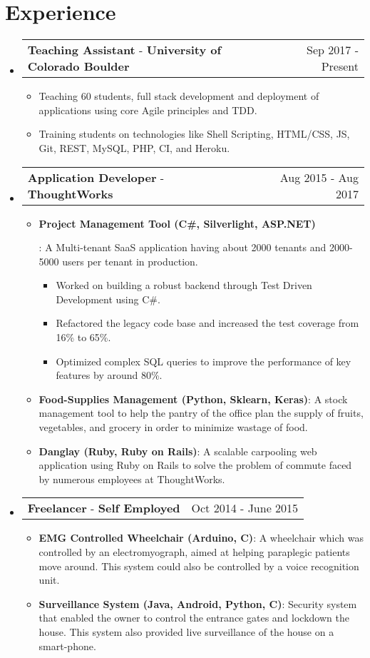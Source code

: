 \documentclass[letterpaper,11pt]{article}
\makeatletter
\newcommand{\resumeItem}[2]{
  \linespread{1.1}
  \item\small{
      \textbf{#1}{: #2}
    }
}
\newcommand{\resumePoint}[1]{
  \linespread{1.2}
  \item\small{#1}
}
\newcommand{\resumeExperienceSubheading}[5]{
  \vspace{-3pt}\item
    \begin{tabular*}{0.97\textwidth}{l@{\extracolsep{\fill}}r}
      \textbf{#1} \normalfont{\small#2} - \textbf{#3}\normalfont{#4} & #5 \\
    \end{tabular*}\vspace{-4pt}
}
\newcommand{\resumeSubHeadingListStart}{\begin{itemize}[leftmargin=*]}
\newcommand{\resumeSubHeadingListEnd}{\end{itemize}\vspace{-14pt}}
\newcommand{\resumeItemListStart}{\begin{itemize}}
\newcommand{\resumeItemListEnd}{\end{itemize}\vspace{-2pt}}
\newcommand{\resumeInnerItemListStart}{\begin{itemize}}
\newcommand{\resumeInnerItemListEnd}{\end{itemize}}
\makeatother
\begin{document}

\section{Experience}
  \resumeSubHeadingListStart
    \resumeExperienceSubheading
      {Teaching Assistant}{\href{https://www.colorado.edu/cs/csci-3308-software-development-methods-and-tools}{(S/W Dev Methods \& Tools)}}{University of Colorado Boulder}{}{Sep 2017 - Present}
      \resumeItemListStart
          \resumePoint{Teaching 60 students, full stack development and deployment of applications using core Agile principles and TDD.
          }
          \resumePoint{Training students on technologies like Shell Scripting, HTML/CSS, JS, Git, REST, MySQL, PHP, CI, and Heroku.
          }
      \resumeItemListEnd
    \resumeExperienceSubheading
      {Application Developer}{}{ThoughtWorks}{, Bangalore, India}{Aug 2015 - Aug 2017}
      \resumeItemListStart
      \resumeItem {Project Management Tool (C\#, Silverlight, ASP.NET)}
          {A Multi-tenant SaaS application having about 2000 tenants and 2000-5000 users per tenant in production.
          \resumeInnerItemListStart
            \resumePoint {Worked on building a robust backend through Test Driven Development using C\#.}
            \resumePoint {Refactored the legacy code base and increased the test coverage from 16\% to 65\%.}
            \resumePoint {Optimized complex SQL queries to improve the performance of key features by around 80\%.}
          \resumeInnerItemListEnd}
        \resumeItem {Food-Supplies Management (Python, Sklearn, Keras)}{A stock management tool to help the pantry of the office plan the supply of fruits, vegetables, and grocery in order to minimize wastage of food.}
      \resumeItem {Danglay (Ruby, Ruby on Rails)}{A scalable carpooling web application using Ruby on Rails to solve the problem of commute faced by numerous employees at ThoughtWorks.}
      \resumeItemListEnd
    \resumeExperienceSubheading
      {Freelancer}{(Embedded System Prototyping)}{Self Employed}{, Bangalore, India}{Oct 2014 - June 2015}
      \resumeItemListStart
          \resumeItem{EMG Controlled Wheelchair (Arduino, C)}{A wheelchair which was controlled by an electromyograph, aimed at helping paraplegic patients move around. This system could also be controlled by a voice recognition unit.}
          \resumeItem{Surveillance System (Java, Android, Python, C)}{Security system that enabled the owner to control the entrance gates and lockdown the house. This system also provided live surveillance of the house on a smart-phone.}
      \resumeItemListEnd
  \resumeSubHeadingListEnd
\end{document}
